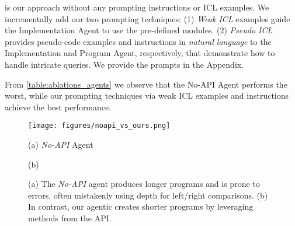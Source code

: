  is our approach without any prompting instructions or ICL examples.
We incrementally add our two prompting techniques: 
(1) \emph{Weak ICL} examples guide the Implementation Agent to use the pre-defined modules. 
(2) \emph{Pseudo ICL} provides pseudo-code examples and instructions in \emph{natural language} to the Implementation and Program Agent, respectively, that demonstrate how to handle intricate queries. We provide the prompts in the Appendix. 

From \cref{table:ablations_agents} we observe that the No-API Agent performs the worst, while our prompting techniques via weak ICL examples and instructions achieve the best performance.

\begin{figure}
    \centering
    \texttt{[image: figures/noapi\_vs\_ours.png]}
    \begin{minipage}{0.4\linewidth}
    \centering
    (a) \emph{No-API} Agent
    \end{minipage}
    \begin{minipage}{0.58\linewidth}
    \centering
    (b) \method
    \end{minipage}
    \vspace{-3mm}
    \caption{(a) The \emph{No-API} agent produces longer programs and is prone to errors, often mistakenly using depth for left/right comparisons. (b) In contrast, our agentic \method creates shorter programs by leveraging methods from the API.}
    \label{fig:noapi_vs_ours}
    \vspace{-6mm}
\end{figure}
